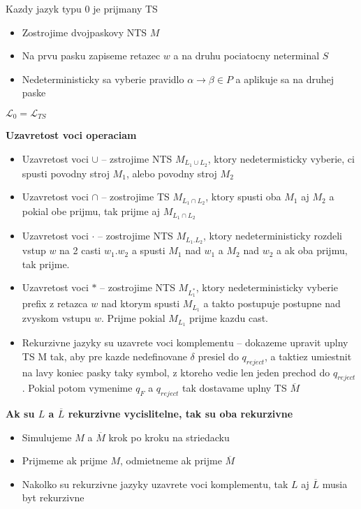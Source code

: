 \documentclass[12pt]{article}
\begin{document}
Kazdy jazyk typu 0 je prijmany TS
\begin{itemize}
	\item Zostrojime dvojpaskovy NTS $M$
	\item Na prvu pasku zapiseme retazec $w$ a na druhu pociatocny neterminal $S$
	\item Nedeterministicky sa vyberie pravidlo $\alpha \to \beta \in P$ a aplikuje sa na druhej paske
\end{itemize}
$\mathcal{L}_{0} = \mathcal{L}_{TS}$

\textbf{Uzavretost voci operaciam}
\begin{itemize}
	\item Uzavretost voci $\cup$ -- zstrojime NTS $M_{L_{1} \cup L_{2}}$, ktory nedetermisticky vyberie, ci
		spusti povodny stroj $M_{1}$, alebo povodny stroj $M_{2}$
	\item Uzavretost voci $\cap$ -- zostrojime TS $M_{L_{1} \cap L_{2}}$, ktory spusti oba $M_{1}$ aj $M_{2}$
		a pokial obe prijmu, tak prijme aj $M_{L_{1} \cap L_{2}}$
	\item Uzavretost voci $\cdot$ -- zostrojime NTS $M_{L_{1}.L_{2}}$, ktory nedeterministicky rozdeli vstup $w$
		na 2 casti $w_{1}.w_{2}$ a spusti $M_{1}$ nad $w_{1}$ a $M_{2}$ nad $w_{2}$ a ak oba prijmu, tak prijme.
	\item Uzavretost voci $*$ -- zostrojime NTS $M_{L_{1}^{*}}$, ktory nedeterministicky vyberie prefix z retazca
		$w$ nad ktorym spusti $M_{L_{1}}$ a takto postupuje postupne nad zvyskom vstupu $w$. Prijme pokial $M_{L_{1}}$
		prijme kazdu cast.
	\item Rekurzivne jazyky su uzavrete voci komplementu -- dokazeme upravit uplny TS M tak, aby pre kazde nedefinovane
		$\delta$ presiel do $q_{reject}$, a taktiez umiestnit na lavy koniec pasky taky symbol, z ktoreho vedie len jeden
		prechod do $q_{reject}$. Pokial potom vymenime $q_{F}$ a $q_{reject}$ tak dostavame uplny TS $\overline{M}$
\end{itemize}

\textbf{Ak su $L$ a $\overline{L}$ rekurzivne vycislitelne, tak su oba rekurzivne}
\begin{itemize}
	\item Simulujeme $M$ a $\overline{M}$ krok po kroku na striedacku
	\item Prijmeme ak prijme $M$, odmietneme ak prijme $\overline{M}$
	\item Nakolko su rekurzivne jazyky uzavrete voci komplementu, tak $L$ aj $\overline{L}$ musia byt rekurzivne
\end{itemize}
\end{document}
